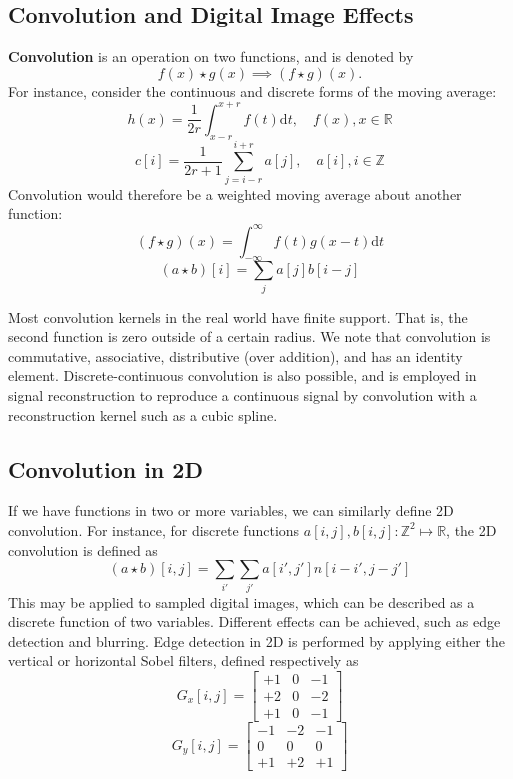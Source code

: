 \documentclass[11pt]{article}
\theoremstyle{plain} %
\theoremstyle{definition}
\theoremstyle{example}
\theoremstyle{remark}
\begin{document}
\subsection{Convolution and Digital Image Effects}

\textbf{Convolution} is an operation on two functions, and is denoted by $$f(x) \star g(x) \implies (f \star g)(x).$$ 
For instance, consider the continuous and discrete forms of the moving average:
$$h(x) = \frac{1}{2r}\int_{x-r}^{x+r}f(t)\mathrm d t, \quad f(x), x\in \mathbb R$$
$$c[i] = \frac{1}{2r+1}\sum_{j=i-r}^{i+r}a[j], \quad a[i], i\in \mathbb Z$$
Convolution would therefore be a weighted moving average about another function:
$$(f \star g)(x) = \int_{-\infty}^{\infty}f(t)g(x-t)\mathrm d t$$
$$(a \star b)[i] = \sum_ja[j]b[i-j]$$

Most convolution kernels in the real world have finite support. That is, the second function is zero outside of a certain radius. We note that convolution is commutative, associative, distributive (over addition), and has an identity element. Discrete-continuous convolution is also possible, and is employed in signal reconstruction to reproduce a continuous signal by convolution with a reconstruction kernel such as a cubic spline. 

\subsection{Convolution in 2D}

If we have functions in two or more variables, we can similarly define 2D convolution. For instance, for discrete functions $a[i,j], b[i,j]:\mathbb Z^2 \mapsto \mathbb R$, the 2D convolution is defined as $$(a \star b)[i,j] = \sum_{i'}\sum_{j'}a[i',j']n[i-i',j-j']$$
This may be applied to sampled digital images, which can be described as a discrete function of two variables. Different effects can be achieved, such as edge detection and blurring. Edge detection in 2D is performed by applying either the vertical or horizontal Sobel filters, defined respectively as $$G_x[i,j] = \begin{bmatrix}+1 & 0 & -1 \\ +2 & 0 & -2 \\ +1 & 0 & -1\end{bmatrix}$$
$$G_y[i,j] = \begin{bmatrix}-1 & -2 & -1 \\ 0 & 0 & 0 \\ +1 & +2 & +1\end{bmatrix}$$
\end{document}

